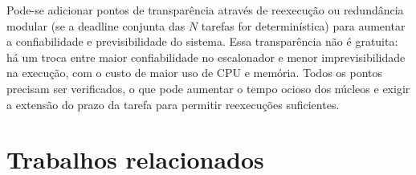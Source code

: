 Pode-se adicionar pontos de transparência através de reexecução ou redundância modular (se a deadline conjunta das $N$ tarefas for determinística) para aumentar a confiabilidade e previsibilidade do sistema. Essa transparência não é gratuita: há um troca entre maior confiabilidade no escalonador e menor imprevisibilidade na execução, com o custo de maior uso de CPU e memória. Todos os pontos precisam ser verificados, o que pode aumentar o tempo ocioso dos núcleos e exigir a extensão do prazo da tarefa para permitir reexecuções suficientes.

\section{Trabalhos relacionados} \label{sec:trabRel}



        
        
        
        
 
